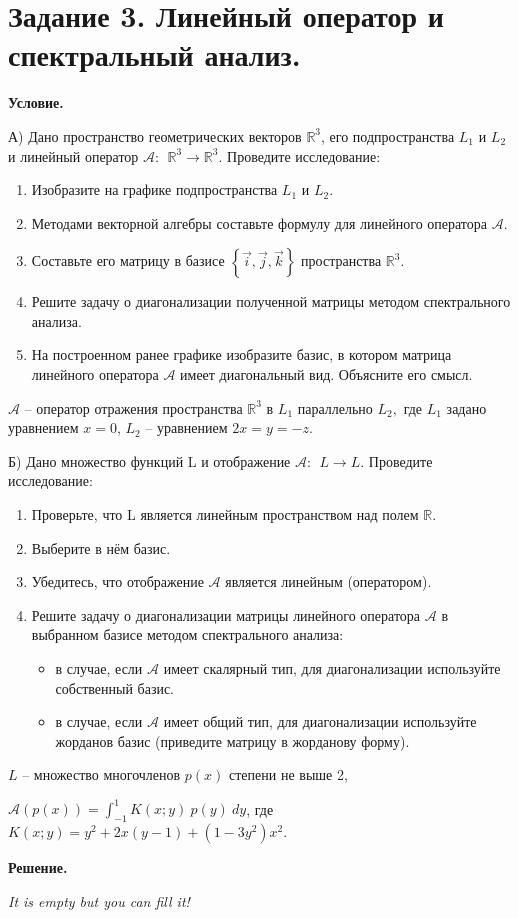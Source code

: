 \section{Задание 3. Линейный оператор и спектральный анализ.}

\textbf{Условие.}

А) Дано пространство геометрических векторов  $\mathbb{R}^3$, его подпространства  $L_1$  и  $L_2$  и линейный оператор  $\mathcal{A}:\ \ \mathbb{R}^3\rightarrow\mathbb{R}^3$.
Проведите исследование:
\begin{enumerate}
	\item Изобразите на графике подпространства  $L_1$  и  $L_2$.
	\item Методами векторной алгебры составьте формулу для линейного оператора  $\mathcal{A}$.
	\item Составьте его матрицу в базисе $\left\{\vec{i},\vec{j},\vec{k}\right\}$ пространства $\mathbb{R}^3$.
	\item Решите задачу о диагонализации полученной матрицы методом спектрального анализа.
	\item На построенном ранее графике изобразите базис, в котором матрица линейного оператора $\mathcal{A}$ имеет диагональный вид. Объясните его смысл.
\end{enumerate}

$\mathcal{A}$ – оператор отражения пространства  $\mathbb{R}^3$ в $L_1$ параллельно $L_2,$ где $L_1$ задано уравнением $x=0$, $L_2$ – уравнением  $2x=y=-z$.

\vspace{10mm}

Б) Дано множество функций  L  и отображение  $\mathcal{A}:\ \ L\rightarrow L$.
Проведите исследование:
\begin{enumerate}
	\item Проверьте, что  L  является линейным пространством над полем $\mathbb{R}$.
	\item Выберите в нём базис.
	\item Убедитесь, что отображение $\mathcal{A}$ является линейным (оператором).
	\item Решите задачу о диагонализации матрицы линейного оператора $\mathcal{A}$ в выбранном базисе методом спектрального анализа:
	\begin{itemize}
        \item в случае, если $\mathcal{A}$ имеет скалярный тип, для диагонализации используйте собственный базис.
        \item в случае, если $\mathcal{A}$ имеет общий тип, для диагонализации используйте жорданов базис (приведите матрицу в жорданову форму).
    \end{itemize}
\end{enumerate}

$L$ – множество многочленов $p\left(x\right)$ степени не выше 2,

$\mathcal{A}\left(p\left(x\right)\right)=\int_{-1}^{1}{K\left(x;y\right)\ p\left(y\right)\ dy}$, где $K\left(x;y\right)=y^2+2x\left(y-1\right)+\left(1-3y^2\right)x^2$.

\vspace{10mm}
\textbf{Решение.}

\textit{It is empty but you can fill it!}

\clearpage
